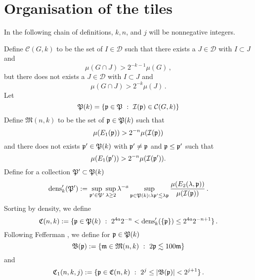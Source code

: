 \section{Organisation of the tiles}\label{subsectilesorg}

In the following chain of definitions, $k, n$, and
$j$ will be nonnegative integers.

Define
$\mathcal{C}(G,k)$ to be the set of $I\in \mathcal{D}$
such that there exists a $J\in \mathcal{D}$ with $I\subset J$
and
\begin{equation}\label{muhj1}
    {\mu(G \cap J)} > 2^{-k-1}{\mu(G)}\, ,
\end{equation}
but there does not exists a $J\in \mathcal{D}$ with $I\subset J$ and
\begin{equation}\label{muhj2}
    {\mu(G \cap J)} > 2^{-k}{\mu(J)}\,.
\end{equation}
Let
\begin{equation}
    \label{eq defPk}
    \mathfrak P(k)=\{\mathfrak p\in \mathfrak P \ : \ \mathcal{I}(\mathfrak p)\in \mathcal{C}(G,k)\}
\end{equation}
Define $ {\mathfrak{M}}(n,k)$ to be the set of  $\mathfrak p \in \mathfrak P(k)$ such that
    \begin{equation}\label{ebardense}
    \mu({E_1}(\mathfrak p))  > 2^{-n}  \mu(\mathcal{I}(\mathfrak p))
    \end{equation}
and there does not exists $\mathfrak p'\in \mathfrak P(k)$ with
$\mathfrak p'\neq \mathfrak p$ and  $\mathfrak p\le \mathfrak p'$  such that
    \begin{equation}\label{mnkmax}
    \mu({E_1}(\mathfrak p'))  > 2^{-n}  \mu(\mathcal{I}(\mathfrak p')).
    \end{equation}
Define for a collection $\mathfrak P'\subset \mathfrak P(k)$
\begin{equation}
    \label{eq densdef}
    \operatorname{\operatorname{dens}}_k' (\mathfrak P'):= \sup_{\mathfrak p'\in \mathfrak P'}\sup_{\lambda \geq 2} \lambda^{-a} \sup_{\mathfrak p \in \mathfrak P(k): \lambda \mathfrak p' \lesssim \lambda \mathfrak p}
    \frac{\mu({E}_2(\lambda, \mathfrak p))}{\mu(\mathcal{I}(\mathfrak p))}\,.
\end{equation}
Sorting by density, we define
\begin{equation}
    \label{def cnk}
    \mathfrak C(n,k):=\{\mathfrak p\in \mathfrak P(k) \ : \
    2^{4a}2^{-n}< \operatorname{\operatorname{dens}}_k'(\{\mathfrak p\}) \le
    2^{4a}2^{-n+1}\}\,.
\end{equation}
Following Fefferman \cite{fefferman}, we
define for $\mathfrak p \in \mathfrak P(k)$
    \begin{equation}\label{defbfp}
            \mathfrak{B}(\fp) := \{ \mathfrak{m} \in \mathfrak{M}(n,k) \ : \ 2 \fp \lesssim 100 \mathfrak{m}\}
    \end{equation}
and
\begin{equation}\label{defcnkj}
        \mathfrak C_1(n,k,j) := \{\mathfrak p \in \mathfrak C(n,k) \ : \ 2^{j} \leq |\mathfrak{B}(\mathfrak p)| < 2^{j+1}\}\,.
\end{equation}
